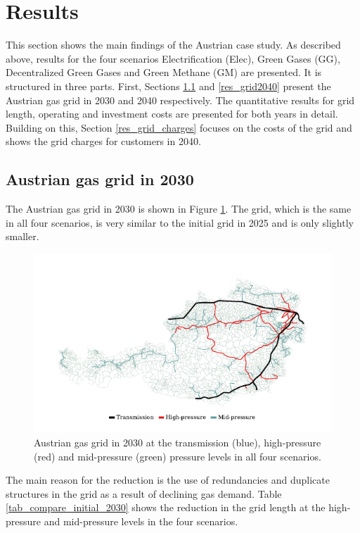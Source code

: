 \section{Results}\label{results}
This section shows the main findings of the Austrian case study. As described above, results for the four scenarios Electrification (Elec), Green Gases (GG), Decentralized Green Gases and Green Methane (GM) are presented. It is structured in three parts. First, Sections \ref{res_grid2030} and \ref{res_grid2040} present the Austrian gas grid in 2030 and 2040 respectively. The quantitative results for grid length, operating and investment costs are presented for both years in detail. Building on this, Section \ref{res_grid_charges} focuses on the costs of the grid and shows the grid charges for customers in 2040. 

\subsection{Austrian gas grid in 2030}\label{res_grid2030}
The Austrian gas grid in 2030 is shown in Figure \ref{fig_grid_2030}. The grid, which is the same in all four scenarios, is very similar to the initial grid in 2025 and is only slightly smaller. 

\begin{figure}[h]
	\centering
	\includegraphics[width=1\linewidth]{figures/results/gas_grid_2030_all_scenarios.pdf}
	\caption{Austrian gas grid in 2030 at the transmission (blue), high-pressure (red) and mid-pressure (green) pressure levels in all four scenarios.}
	\label{fig_grid_2030}
\end{figure}

The main reason for the reduction is the use of redundancies and duplicate structures in the grid as a result of declining gas demand. Table \ref{tab_compare_initial_2030} shows the reduction in the grid length at the high-pressure and mid-pressure levels in the four scenarios. 

